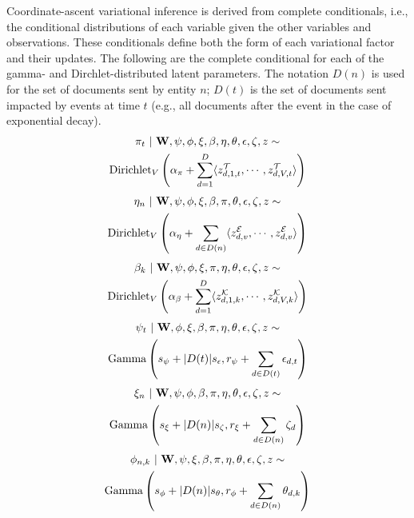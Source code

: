 Coordinate-ascent variational inference is derived from complete conditionals, i.e., the conditional distributions of each variable given the other variables and observations. These conditionals define both the form of each variational factor and their updates. The following are the complete conditional for each of the gamma- and Dirchlet-distributed latent parameters.  The notation $D(n)$ is used for the set of documents sent by entity $n$; $D(t)$ is the set of documents sent impacted by events at time $t$ (e.g., all documents after the event in the case of exponential decay).
\begin{multline}
\pi_t ~\vert~ \mathbf{W}, \psi, \phi, \xi, \beta, \eta, \theta, \epsilon, \zeta, z \sim \\
	\mbox{Dirichlet}_V\left(\alpha_\pi + \sum_{d=1}^D \langle
		z^\mathcal{T}_{d,1,t}, \cdots, z^\mathcal{T}_{d,V,t}\rangle
	\right)
\label{eq:pi}
\end{multline}
\begin{multline}
\eta_n ~\vert~ \mathbf{W}, \psi, \phi, \xi, \beta, \pi, \theta, \epsilon, \zeta, z \sim \\
	\mbox{Dirichlet}_V\left(\alpha_\eta + \sum_{d\in D(n)} \langle
		z^\mathcal{E}_{d,v}, \cdots, z^\mathcal{E}_{d,v}\rangle
	\right)
\label{eq:eta}
\end{multline}
\begin{multline}
\beta_k ~\vert~ \mathbf{W}, \psi, \phi, \xi, \pi, \eta, \theta, \epsilon, \zeta, z \sim \\
	\mbox{Dirichlet}_V\left(\alpha_\beta + \sum_{d=1}^D \langle
		z^\mathcal{K}_{d,1,k}, \cdots, z^\mathcal{K}_{d,V,k}\rangle
	\right)
\label{eq:beta}
\end{multline}
\begin{multline}
\psi_t ~\vert~ \mathbf{W}, \phi, \xi, \beta, \pi, \eta, \theta, \epsilon, \zeta, z \sim \\
	\mbox{Gamma}\left(
		s_\psi + |D(t)| s_\epsilon,
		r_\psi + \sum_{d\in D(t)} \epsilon_{d,t}
	\right)
\label{eq:psi}
\end{multline}
\begin{multline}
\xi_n ~\vert~ \mathbf{W}, \psi, \phi, \beta, \pi, \eta, \theta, \epsilon, \zeta, z \sim \\
	\mbox{Gamma}\left(
		s_\xi + |D(n)| s_\zeta,
		r_\xi + \sum_{d\in D(n)} \zeta_{d}
	\right)
\label{eq:xi}
\end{multline}
\begin{multline}
\phi_{n,k} ~\vert~ \mathbf{W}, \psi, \xi, \beta, \pi, \eta, \theta, \epsilon, \zeta, z \sim \\
	\mbox{Gamma}\left(
		s_\phi + |D(n)| s_\theta,
		r_\phi + \sum_{d\in D(n)} \theta_{d,k}
	\right)
\label{eq:phi}
\end{multline}
